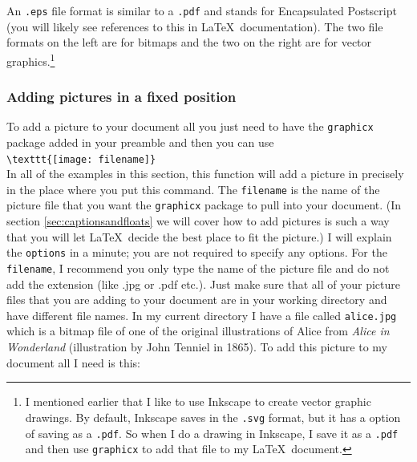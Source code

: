 \documentclass{article}
\newcommand{\nid}{\noindent} %
\begin{document}
An \texttt{.eps} file format is similar to a \texttt{.pdf} and stands for Encapsulated Postscript (you will likely see references to this in \LaTeX\ documentation).  The two file formats on the left are for bitmaps and the two on the right are for vector graphics.\footnote{I mentioned earlier that I like to use Inkscape to create vector graphic drawings.  By default, Inkscape saves in the \texttt{.svg} format, but it has a option of saving as a \texttt{.pdf}.  So when I do a drawing in Inkscape, I save it as a \texttt{.pdf} and then use \texttt{graphicx} to add that file to my \LaTeX\ document.}

\subsubsection{Adding pictures in a fixed position}\label{sec:fixedpositionpics}
To add a picture to your document all you just need to have the \texttt{graphicx} package added in your preamble and then you can use\\

\nid\verb|\texttt{[image: filename]}|\\

\nid In all of the examples in this section, this function will add a picture in precisely in the place where you put this command.   The \texttt{filename} is the name of the picture file that you want the \texttt{graphicx} package to pull into your document.   (In section \ref{sec:captionsandfloats} we will cover how to add pictures is such a way that you will let \LaTeX\ decide the best place to fit the picture.) I will explain the \texttt{options} in a minute; you are not required  to specify any options.  For the \texttt{filename}, I recommend you only type the name of the picture file and do not add the extension (like .jpg or .pdf etc.).  Just make sure that all of your picture files that you are adding to your document are in your working directory and have different file names.  In my current directory I have a file called \texttt{alice.jpg} which is a bitmap file of one of the original illustrations of Alice from \textit{Alice in Wonderland} (illustration by John Tenniel in 1865). To add this picture to my document all I need is this:\\
\end{document}
